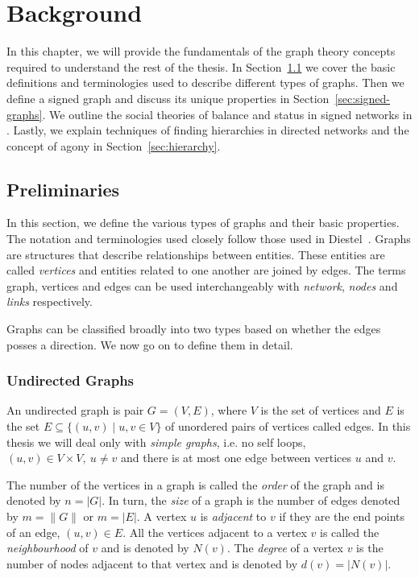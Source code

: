
\chapter{Background}
\label{chp:background}

In this chapter, we will provide the fundamentals of the graph theory concepts required to understand the rest of the thesis. In Section~\ref{sec:prelim} we cover the basic definitions and terminologies used to describe different types of graphs. Then we define a signed graph and discuss its unique properties in Section~\ref{sec:signed-graphs}. We outline the social theories of balance and status in signed networks in . Lastly, we explain techniques of finding hierarchies in directed networks and the concept of agony in Section~\ref{sec:hierarchy}.

\section{Preliminaries}
\label{sec:prelim}
In this section, we define the various types of graphs and their basic properties. The notation and terminologies used closely follow those used in Diestel~\cite{diestel1997graph}. Graphs are structures that describe relationships between entities. These entities are called \textit{vertices} and entities related to one another are joined by edges. The terms graph, vertices and edges can be used interchangeably with \textit{network}, \textit{nodes} and \textit{links} respectively.

Graphs can be classified broadly into two types based on whether the edges posses a direction. We now go on to define them in detail.
\subsection{Undirected Graphs}
An undirected graph is pair $G=(V,E)$, where $V$ is the set of vertices and $E$ is the set $E \subseteq \{ (u,v) \mid u,v \in V\}$ of unordered pairs of vertices called edges. In this thesis we will deal only with \textit{simple graphs}, i.e. no self loops, $(u,v)\in V \times V, ~ u\neq v$ and there is at most one edge between vertices $u$ and $v$. 

The number of the vertices in a graph is called the \textit{order} of the graph and is denoted by $n= |G|$. In turn, the \textit{size} of a graph is the number of edges denoted by $m = \|G\|$ or $m=|E|$. A vertex $u$ is \textit{adjacent} to $v$ if they are the end points of an edge, $(u,v) \in E$. All the vertices adjacent to a vertex $v$ is called the \textit{neighbourhood} of $v$ and is denoted by $N(v)$. The \textit{degree} of a vertex $v$ is the number of nodes adjacent to that vertex and is denoted by $d(v) = |N(v)|$. 

